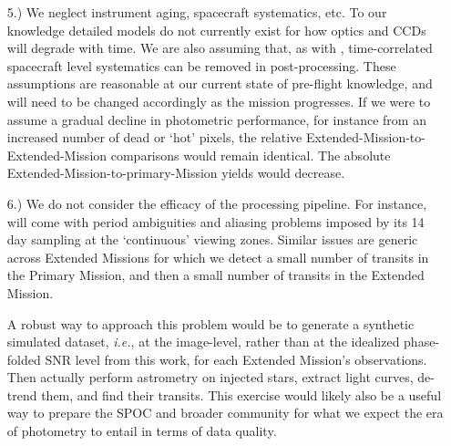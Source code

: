 \begin{itemize}
	
	
	\item [5.) We neglect instrument aging, spacecraft systematics, etc.]
	To our knowledge detailed models do not currently exist for how \tesss 
	optics and CCDs will degrade with time.
	We are also assuming that, as with \ktwo\!, time-correlated spacecraft level systematics can be removed in post-processing.
	These assumptions are reasonable at our current state of pre-flight knowledge, and will need to be changed accordingly as the mission progresses.
	If we were to assume a gradual decline in photometric performance, for instance from an increased number of dead or `hot' pixels, the relative Extended-Mission-to-Extended-Mission comparisons would remain identical.
	The absolute Extended-Mission-to-primary-Mission yields would decrease.
	
	\item [6.) We do not consider the efficacy of the processing pipeline.]
	For instance, \hemis\:will come with period ambiguities and aliasing problems imposed by its 14 day sampling at the `continuous' viewing zones.
	Similar issues are generic across Extended Missions for which we detect a small number of transits in the Primary Mission, and then a small number of transits in the Extended Mission.
	
	A robust way to approach this problem would be to generate a synthetic simulated \tess dataset, \textit{i.e.}, at the image-level, rather than at the idealized phase-folded SNR level from this work, for each Extended Mission's observations.
	Then actually perform astrometry on injected stars, extract light curves, de-trend them, and find their transits.
	This exercise would likely also be a useful way to prepare the SPOC and broader community for what we expect the era of \tess photometry to entail in terms of data quality.	
\end{itemize}


